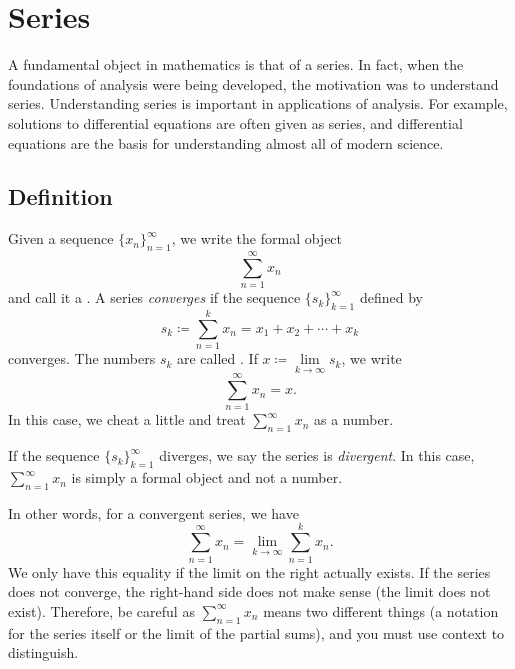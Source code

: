
\sectionnewpage
\section{Series}
\label{sec:series}


A fundamental object in mathematics is that of a series.  In fact, when
the foundations of analysis were being developed, the motivation was to
understand series.  Understanding series is important in applications
of analysis.  For example, solutions to differential equations are often
given as series, and differential equations are the basis for understanding
almost all of modern science.

\subsection{Definition}

\begin{defn}
Given a sequence $\{ x_n \}_{n=1}^\infty$, we write the formal object
\begin{equation*}
\sum_{n=1}^\infty x_n
\end{equation*}
and call it a \emph{}.  A series
\emph{converges} if the sequence
$\{ s_k \}_{k=1}^\infty$
defined by
\begin{equation*}
s_k \coloneqq \sum_{n=1}^k x_n = x_1 + x_2 + \cdots + x_k
\end{equation*}
converges.
The numbers $s_k$ are called
\emph{}.
If $x \coloneqq \lim\limits_{k\to\infty} s_k$, we write
\begin{equation*}
\sum_{n=1}^\infty x_n =  x .
\end{equation*}
In this case, we cheat a little and treat
$\sum_{n=1}^\infty x_n$ as a number.

If the sequence $\{ s_k \}_{k=1}^\infty$ diverges,
we say the series is \emph{divergent}.
In this case, $\sum_{n=1}^\infty x_n$ is simply a formal object and not a number.
\end{defn}

In other words, for a convergent series, we have
\begin{equation*}
\sum_{n=1}^\infty x_n
=
\lim_{k\to\infty} 
\sum_{n=1}^k x_n .
\end{equation*}
We only have this equality if the limit on
the right actually exists.  If the series does not converge, the right-hand
side does not make sense (the limit does not exist).
Therefore, be careful as 
$\sum_{n=1}^\infty x_n$ means two different things (a notation for the series itself 
or the limit of the partial sums), and you must use context
to distinguish.

